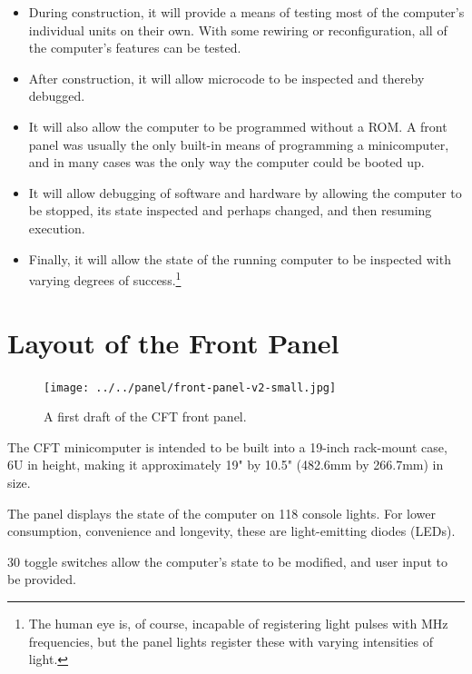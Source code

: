 \begin{itemize}
\item During construction, it will provide a means of testing most of
  the computer's individual units on their own. With some rewiring or
  reconfiguration, all of the computer's features can be tested.

\item After construction, it will allow microcode to be inspected and
  thereby debugged.

\item It will also allow the computer to be programmed without a
  ROM. A front panel was usually the only built-in means of
  programming a minicomputer, and in many cases was the only way the
  computer could be booted up.

\item It will allow debugging of software and hardware by allowing the
  computer to be stopped, its state inspected and perhaps changed, and
  then resuming execution.

\item Finally, it will allow the state of the running computer to be
  inspected with varying degrees of success.\footnote{The human eye
    is, of course, incapable of registering light pulses with MHz
    frequencies, but the panel lights register these with varying
    intensities of light.}

\end{itemize}

\section{Layout of the Front Panel}

\begin{figure}[t]
\centering
\texttt{[image: ../../panel/front-panel-v2-small.jpg]}\\
\caption{\label{fig-panel}A first draft of the CFT front panel.}
\end{figure}

The CFT minicomputer is intended to be built into a 19-inch rack-mount case, 6U
in height, making it approximately 19" by 10.5" (482.6mm by 266.7mm) in size.

The panel displays the state of the computer on 118 console lights. For lower
consumption, convenience and longevity, these are light-emitting diodes (LEDs).

30 toggle switches allow the computer's state to be modified, and user input to
be provided.

